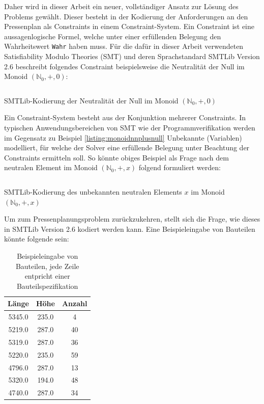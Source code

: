 Daher wird in dieser Arbeit ein neuer, vollständiger Ansatz zur Lösung des Problems gewählt.
Dieser besteht in der Kodierung der Anforderungen an den Pressenplan als Constraints in einem Constraint-System.
Ein Constraint ist eine aussagenlogische Formel, welche unter einer erfüllenden Belegung den Wahrheitswert \texttt{Wahr} haben muss.
Für die dafür in dieser Arbeit verwendeten Satisfiability Modulo Theories (SMT) und deren Sprachstandard SMTLib Version 2.6 \cite{smtlib}
beschreibt folgendes Constraint beispielsweise die Neutralität der Null im Monoid $(\mathbb{N}_0, +, 0)$:

\begin{listing}[H]
    \inputminted[linenos=true]{haskell}{Code/Einleitung/MonoidNPlusNull.smt2}
    \caption{SMTLib-Kodierung der Neutralität der Null im Monoid $(\mathbb{N}_0, +, 0)$}
    \label{listing:monoidnnplusnull}
\end{listing}

Ein Constraint-System besteht aus der Konjunktion mehrerer Constraints.
In typischen Anwendungsbereichen von SMT wie der Programmverifikation \cite{smt} werden im Gegensatz zu Beispiel \ref{listing:monoidnnplusnull}
Unbekannte (Variablen) modelliert, für welche der Solver eine erfüllende Belegung unter Beachtung der Constraints ermitteln soll.
So könnte obiges Beispiel als Frage nach dem neutralen Element im Monoid $(\mathbb{N}_0, +, x)$ folgend formuliert werden:

\begin{listing}[H]
    \inputminted[linenos=true]{bash}{Code/Einleitung/MonoidNPlusZ.smt2}
    \caption{SMTLib-Kodierung des unbekannten neutralen Elements $x$ im Monoid $(\mathbb{N}_0, +, x)$}
    \label{listing:monoidnnplusz}
\end{listing}

Um zum Pressenplanungsproblem zurückzukehren, stellt sich die Frage, wie dieses in SMTLib Version 2.6 kodiert werden kann.
Eine Beispieleingabe von Bauteilen könnte folgende sein:

\begin{table}[H]
    \centering
    \begin{tabular}{|c|c|c|}
        \hline
        \textbf{Länge} & \textbf{Höhe} & \textbf{Anzahl} \\
        \hline
        5345.0 & 235.0 & 4 \\
        5219.0 & 287.0 & 40 \\
        5319.0 & 287.0 & 36 \\
        5220.0 & 235.0 & 59 \\
        4796.0 & 287.0 & 13 \\
        5320.0 & 194.0 & 48 \\
        4740.0 & 287.0 & 34 \\
        \hline
    \end{tabular}
    \caption{Beispieleingabe von Bauteilen, jede Zeile entpricht einer Bauteilspezifikation}
    \label{table:bauteileingabe}
\end{table}

